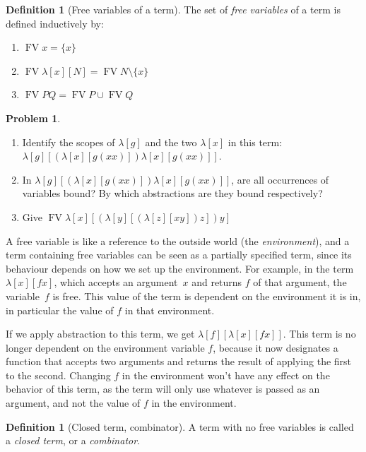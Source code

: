 \documentclass[10pt,a4paper]{article}
\theoremstyle{plain}
\theoremstyle{definition}
\newtheorem{defn}[thm]{Definition}
\newtheorem{prob}{Problem}[section]
\theoremstyle{remark}
\newenvironment{explain}{}{}
\newcommand*{\ollabel}[1]{\label{#1}}
\providecommand{\lambd}{\ensuremath{\lambda}}
\providecommand{\FV}{\operatorname{FV}}
\providecommand{\FV}{\operatorname{FV}}
\begin{document}
\begin{defn}[Free variables of a term] \ollabel{def:fv}
  The set of \emph{free variables} of a term is defined inductively by:
  \begin{enumerate}
    \item $\FV{x} = \{x\}$ \ollabel{def:fv1} 
    \item $\FV{\lambd[x][N]} = \FV{N} \setminus \{x\}$    \ollabel{def:fv2}
    \item $\FV{PQ} = \FV{P} \cup \FV{Q}$ \ollabel{def:fv3}
  \end{enumerate}
\end{defn}

\begin{prob}
  \begin{enumerate}
  \item Identify the scopes of $\lambd[g]$ and the two $\lambd[x]$ in
    this term: $\lambd[g][(\lambd[x][g (x x)]) \lambd[x][g (x x)]]$.
  \item In $\lambd[g][(\lambd[x][g (x x)]) \lambd[x][g (x x)]]$, are
    all occurrences of variables bound? By which abstractions are they
    bound respectively?
    \item Give $\FV{\lambd[x][(\lambd[y][(\lambd[z][x y]) z]) y]}$
  \end{enumerate}
\end{prob}

\begin{explain}
A free variable is like a reference to the outside world (the
\emph{environment}), and a term containing free variables can be seen
as a partially specified term, since its behaviour depends on how we
set up the environment. For example, in the term $\lambd[x][f x]$, which
accepts an argument~$x$ and returns $f$ of that argument, the
variable~$f$ is free. This value of the term is dependent on the
environment it is in, in particular the value of $f$ in that
environment.

If we apply abstraction to this term, we get $\lambd[f][\lambd[x][f
    x]]$. This term is no longer dependent on the environment variable
$f$, because it now designates a function that accepts two arguments
and returns the result of applying the first to the second. Changing
$f$ in the environment won't have any effect on the behavior of this
term, as the term will only use whatever is passed as an argument, and
not the value of $f$ in the environment.
\end{explain}

\begin{defn}[Closed term, combinator]
  A term with no free variables is called a \emph{closed term}, or a
  \emph{combinator}.
\end{defn}
\end{document}
